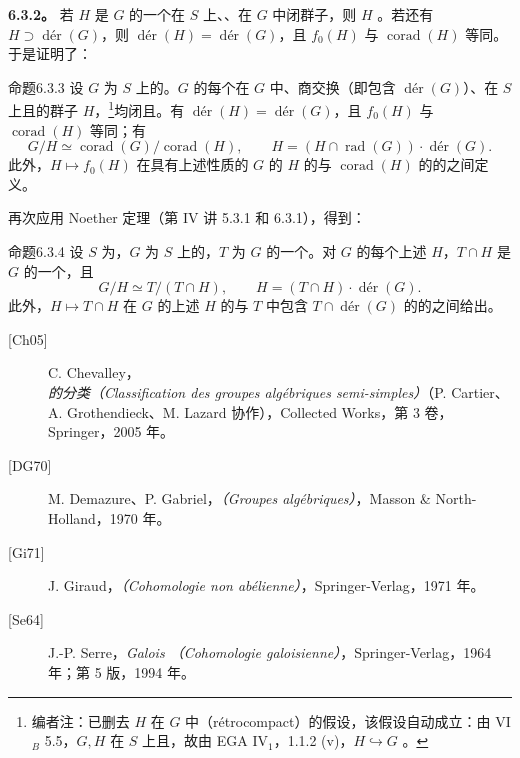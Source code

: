 \textbf{6.3.2。} 若 $H$ 是 $G$ 的一个在 $S$ 上、、在 $G$ 中闭群子，则 $H$ 。若还有 $H\supset\operatorname{d\text{é}r}(G)$，则 $\operatorname{d\text{é}r}(H)=\operatorname{d\text{é}r}(G)$，且 $f_0(H)$ 与 $\operatorname{corad}(H)$ 等同。于是证明了：
\begin{SGAresult}{命题}{6.3.3}
设 $G$ 为 $S$ 上的。$G$ 的每个在 $G$ 中、商交换（即包含 $\operatorname{d\text{é}r}(G)$）、在 $S$ 上且的群子 $H$，\footnote{编者注：已删去 $H$ 在 $G$ 中（rétrocompact）的假设，该假设自动成立：由 VI$_B$ 5.5，$G,H$ 在 $S$ 上且，故由 EGA IV$_1$，1.1.2 (v)，$H\hookrightarrow G$ 。}均闭且。有 $\operatorname{d\text{é}r}(H)=\operatorname{d\text{é}r}(G)$，且 $f_0(H)$ 与 $\operatorname{corad}(H)$ 等同；有
\[G/H\simeq\operatorname{corad}(G)/\operatorname{corad}(H),\qquad
H=(H\cap\operatorname{rad}(G))\cdot\operatorname{d\text{é}r}(G).\]
此外，$H\mapsto f_0(H)$ 在具有上述性质的 $G$ 的 $H$ 的与 $\operatorname{corad}(H)$ 的的之间定义。
\end{SGAresult}
再次应用 Noether 定理（第 IV 讲 5.3.1 和 6.3.1），得到：
\begin{SGAresult}{命题}{6.3.4}
设 $S$ 为，$G$ 为 $S$ 上的，$T$ 为 $G$ 的一个。对 $G$ 的每个上述 $H$，$T\cap H$ 是 $G$ 的一个，且
\[G/H\simeq T/(T\cap H),\qquad H=(T\cap H)\cdot\operatorname{d\text{é}r}(G).\]
此外，$H\mapsto T\cap H$ 在 $G$ 的上述 $H$ 的与 $T$ 中包含 $T\cap\operatorname{d\text{é}r}(G)$ 的的之间给出。
\end{SGAresult}
\begin{description}
\item[{[Ch05]}] C. Chevalley，\emph{的分类（Classification des groupes algébriques semi-simples）}（P. Cartier、A. Grothendieck、M. Lazard 协作），Collected Works，第 3 卷，Springer，2005 年。
\item[{[DG70]}] M. Demazure、P. Gabriel，\emph{（Groupes algébriques）}，Masson \& North-Holland，1970 年。
\item[{[Gi71]}] J. Giraud，\emph{（Cohomologie non abélienne）}，Springer-Verlag，1971 年。
\item[{[Se64]}] J.-P. Serre，\emph{Galois （Cohomologie galoisienne）}，Springer-Verlag，1964 年；第 5 版，1994 年。
\end{description}

